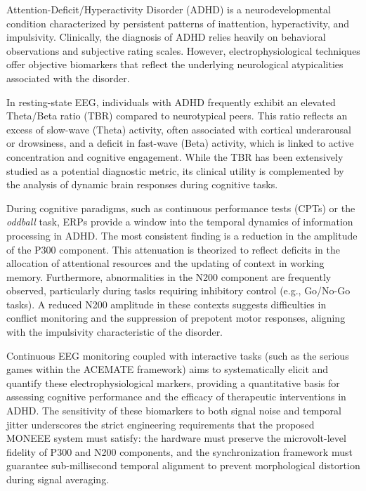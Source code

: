 Attention-Deficit/Hyperactivity Disorder (ADHD) is a neurodevelopmental condition characterized by persistent patterns of inattention, hyperactivity, and impulsivity. Clinically, the diagnosis of ADHD relies heavily on behavioral observations and subjective rating scales. However, electrophysiological techniques offer objective biomarkers that reflect the underlying neurological atypicalities associated with the disorder.

In resting-state EEG, individuals with ADHD frequently exhibit an elevated Theta/Beta ratio (TBR) compared to neurotypical peers. This ratio reflects an excess of slow-wave (Theta) activity, often associated with cortical underarousal or drowsiness, and a deficit in fast-wave (Beta) activity, which is linked to active concentration and cognitive engagement. While the TBR has been extensively studied as a potential diagnostic metric, its clinical utility is complemented by the analysis of dynamic brain responses during cognitive tasks.

During cognitive paradigms, such as continuous performance tests (CPTs) or the \textit{oddball} task, ERPs provide a window into the temporal dynamics of information processing in ADHD. The most consistent finding is a reduction in the amplitude of the P300 component. This attenuation is theorized to reflect deficits in the allocation of attentional resources and the updating of context in working memory. Furthermore, abnormalities in the N200 component are frequently observed, particularly during tasks requiring inhibitory control (e.g., Go/No-Go tasks). A reduced N200 amplitude in these contexts suggests difficulties in conflict monitoring and the suppression of prepotent motor responses, aligning with the impulsivity characteristic of the disorder.

Continuous EEG monitoring coupled with interactive tasks (such as the serious games within the ACEMATE framework) aims to systematically elicit and quantify these electrophysiological markers, providing a quantitative basis for assessing cognitive performance and the efficacy of therapeutic interventions in ADHD. The sensitivity of these biomarkers to both signal noise and temporal jitter underscores the strict engineering requirements that the proposed MONEEE system must satisfy: the hardware must preserve the microvolt-level fidelity of P300 and N200 components, and the synchronization framework must guarantee sub-millisecond temporal alignment to prevent morphological distortion during signal averaging.

